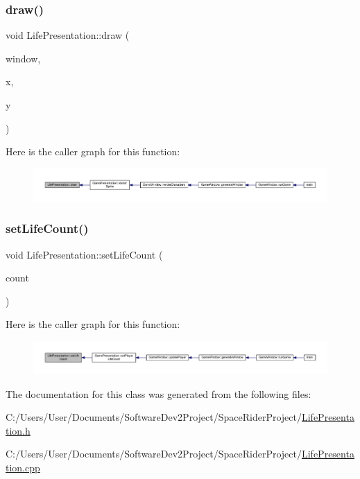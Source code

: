 \subsubsection{\texorpdfstring{draw()}{draw()}}
{\footnotesize\ttfamily void Life\+Presentation\+::draw (\begin{DoxyParamCaption}\item[{sf\+::\+Render\+Window \&}]{window,  }\item[{float}]{x,  }\item[{float}]{y }\end{DoxyParamCaption})}

Here is the caller graph for this function\+:\nopagebreak
\begin{figure}[H]
\begin{center}
\leavevmode
\includegraphics[width=350pt]{class_life_presentation_a78c9fdc72d78cb619a885d251996c3ff_icgraph}
\end{center}
\end{figure}
\mbox{\label{class_life_presentation_a4baba880082d5281a2fcb6b19d178418}} 
\subsubsection{\texorpdfstring{set\+Life\+Count()}{setLifeCount()}}
{\footnotesize\ttfamily void Life\+Presentation\+::set\+Life\+Count (\begin{DoxyParamCaption}\item[{int}]{count }\end{DoxyParamCaption})}

Here is the caller graph for this function\+:\nopagebreak
\begin{figure}[H]
\begin{center}
\leavevmode
\includegraphics[width=350pt]{class_life_presentation_a4baba880082d5281a2fcb6b19d178418_icgraph}
\end{center}
\end{figure}


The documentation for this class was generated from the following files\+:\begin{DoxyCompactItemize}
\item 
C\+:/\+Users/\+User/\+Documents/\+Software\+Dev2\+Project/\+Space\+Rider\+Project/\hyperlink{_life_presentation_8h}{Life\+Presentation.\+h}\item 
C\+:/\+Users/\+User/\+Documents/\+Software\+Dev2\+Project/\+Space\+Rider\+Project/\hyperlink{_life_presentation_8cpp}{Life\+Presentation.\+cpp}\end{DoxyCompactItemize}
